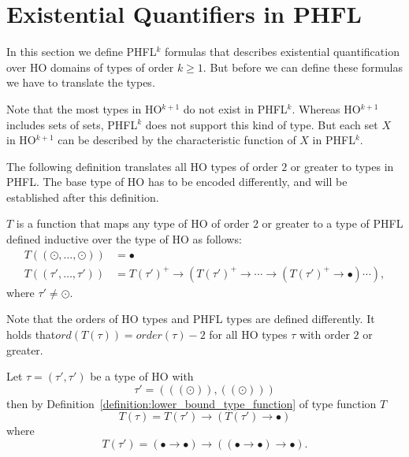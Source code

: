 

\section{Existential Quantifiers in PHFL}\label{sec:existential_quantifiers_in_phfl}

In this section we define PHFL$^{k}$ formulas that describes existential quantification over HO domains of types of
order $k \geq 1$. But before we can define these formulas we have to translate the types.


Note that the most types in HO$^{k + 1}$ do not exist in PHFL$^k$. Whereas HO$^{k +
1}$ includes sets of sets, PHFL$^k$ does not support this kind of type.
But each set $X$ in HO$^{k+1}$ can be described by the characteristic function of $X$ in PHFL$^k$.

The following definition translates all HO types of order $2$ or greater to types in PHFL. The base type of HO
has to be encoded differently, and will be established after this definition.

\begin{definition}
    \label{definition:lower_bound_type_function}
    $T$ is a function that maps any type of HO of order $2$ or greater to a type of PHFL defined inductive over the
    type of HO as follows:
    \begin{align*}
        T((\odot, \dots, \odot)) &= \bullet\\
        T((\tau', \dots, \tau')) &= T(\tau')^+ \rightarrow (T(\tau')^+ \rightarrow \dotsb \rightarrow (T(\tau')^+
        \rightarrow \bullet) \dotsb ),
    \end{align*}
    where $\tau' \neq \odot$.
\end{definition}

Note that the orders of HO types and PHFL types are defined differently. It holds that$ord(T(\tau)) = order(\tau) - 2$
for all HO types $\tau$ with order $2$ or greater.

\begin{example}
    Let $\tau = (\tau', \tau')$ be a type of HO with
    \[\tau' = (((\odot)), ((\odot)))\]
    then by Definition~\ref{definition:lower_bound_type_function} of type function $T$
    \[T(\tau) = T(\tau') \rightarrow (T(\tau') \rightarrow \bullet)\]
    where
    \[T(\tau') = (\bullet \rightarrow \bullet) \rightarrow ((\bullet \rightarrow \bullet) \rightarrow \bullet).\]
\end{example}

